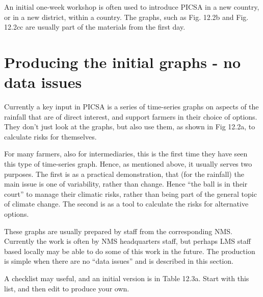 \documentclass[
  letterpaper,
  DIV=11,
  numbers=noendperiod]{scrreprt}
\begin{document}
An initial one-week workshop is often used to introduce PICSA in a new
country, or in a new district, within a country. The graphs, such as
Fig. 12.2b and Fig. 12.2cc are usually part of the materials from the
first day.

\section{Producing the initial graphs - no data
issues}\label{producing-the-initial-graphs---no-data-issues}

Currently a key input in PICSA is a series of time-series graphs on
aspects of the rainfall that are of direct interest, and support farmers
in their choice of options. They don't just look at the graphs, but also
use them, as shown in Fig 12.2a, to calculate risks for themselves.

For many farmers, also for intermediaries, this is the first time they
have seen this type of time-series graph. Hence, as mentioned above, it
usually serves two purposes. The first is as a practical demonstration,
that (for the rainfall) the main issue is one of variability, rather
than change. Hence ``the ball is in their court'' to manage their
climatic risks, rather than being part of the general topic of climate
change. The second is as a tool to calculate the risks for alternative
options.

These graphs are usually prepared by staff from the corresponding NMS.
Currently the work is often by NMS headquarters staff, but perhaps LMS
staff based locally may be able to do some of this work in the future.
The production is simple when there are no ``data issues'' and is
described in this section.

A checklist may useful, and an initial version is in Table 12.3a. Start
with this list, and then edit to produce your own.
\end{document}
